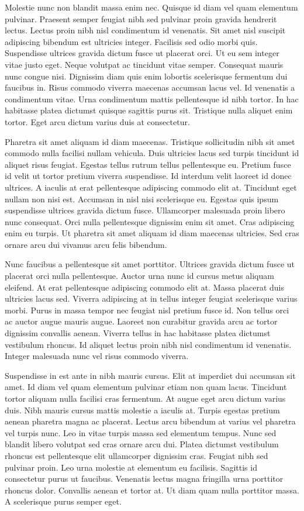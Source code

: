\documentclass[11pt,a4paper]{article}
\begin{document}
Molestie nunc non blandit massa enim nec. Quisque id diam vel quam elementum pulvinar. Praesent semper feugiat nibh sed pulvinar proin gravida hendrerit lectus. Lectus proin nibh nisl condimentum id venenatis. Sit amet nisl suscipit adipiscing bibendum est ultricies integer. Facilisis sed odio morbi quis. Suspendisse ultrices gravida dictum fusce ut placerat orci. Ut eu sem integer vitae justo eget. Neque volutpat ac tincidunt vitae semper. Consequat mauris nunc congue nisi. Dignissim diam quis enim lobortis scelerisque fermentum dui faucibus in. Risus commodo viverra maecenas accumsan lacus vel. Id venenatis a condimentum vitae. Urna condimentum mattis pellentesque id nibh tortor. In hac habitasse platea dictumst quisque sagittis purus sit. Tristique nulla aliquet enim tortor. Eget arcu dictum varius duis at consectetur.

Pharetra sit amet aliquam id diam maecenas. Tristique sollicitudin nibh sit amet commodo nulla facilisi nullam vehicula. Duis ultricies lacus sed turpis tincidunt id aliquet risus feugiat. Egestas tellus rutrum tellus pellentesque eu. Pretium fusce id velit ut tortor pretium viverra suspendisse. Id interdum velit laoreet id donec ultrices. A iaculis at erat pellentesque adipiscing commodo elit at. Tincidunt eget nullam non nisi est. Accumsan in nisl nisi scelerisque eu. Egestas quis ipsum suspendisse ultrices gravida dictum fusce. Ullamcorper malesuada proin libero nunc consequat. Orci nulla pellentesque dignissim enim sit amet. Cras adipiscing enim eu turpis. Ut pharetra sit amet aliquam id diam maecenas ultricies. Sed cras ornare arcu dui vivamus arcu felis bibendum.

Nunc faucibus a pellentesque sit amet porttitor. Ultrices gravida dictum fusce ut placerat orci nulla pellentesque. Auctor urna nunc id cursus metus aliquam eleifend. At erat pellentesque adipiscing commodo elit at. Massa placerat duis ultricies lacus sed. Viverra adipiscing at in tellus integer feugiat scelerisque varius morbi. Purus in massa tempor nec feugiat nisl pretium fusce id. Non tellus orci ac auctor augue mauris augue. Laoreet non curabitur gravida arcu ac tortor dignissim convallis aenean. Viverra tellus in hac habitasse platea dictumst vestibulum rhoncus. Id aliquet lectus proin nibh nisl condimentum id venenatis. Integer malesuada nunc vel risus commodo viverra.

Suspendisse in est ante in nibh mauris cursus. Elit at imperdiet dui accumsan sit amet. Id diam vel quam elementum pulvinar etiam non quam lacus. Tincidunt tortor aliquam nulla facilisi cras fermentum. At augue eget arcu dictum varius duis. Nibh mauris cursus mattis molestie a iaculis at. Turpis egestas pretium aenean pharetra magna ac placerat. Lectus arcu bibendum at varius vel pharetra vel turpis nunc. Leo in vitae turpis massa sed elementum tempus. Nunc sed blandit libero volutpat sed cras ornare arcu dui. Platea dictumst vestibulum rhoncus est pellentesque elit ullamcorper dignissim cras. Feugiat nibh sed pulvinar proin. Leo urna molestie at elementum eu facilisis. Sagittis id consectetur purus ut faucibus. Venenatis lectus magna fringilla urna porttitor rhoncus dolor. Convallis aenean et tortor at. Ut diam quam nulla porttitor massa. A scelerisque purus semper eget.
\end{document}
